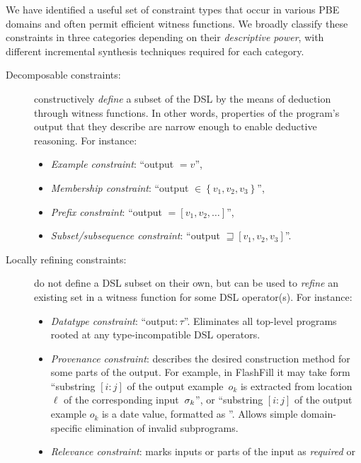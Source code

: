 We have identified a useful set of constraint types that occur in various PBE domains and often permit efficient witness
functions.
We broadly classify these constraints in three categories depending on their \emph{descriptive power}, with different
incremental synthesis techniques required for each category.
\begin{description}
    \item[Decomposable constraints:] constructively \emph{define} a subset of the DSL by the means of
        deduction through witness functions.
        In other words, properties of the program's output that they describe are narrow enough to enable deductive
        reasoning.
        For instance:
        \begin{itemize}[nosep]
            \item \emph{Example constraint}: ``output $= v$'',
            \item \emph{Membership constraint}: ``output $\in \left\{v_1, v_2, v_3\right\}$'',
            \item \emph{Prefix constraint}: ``output $= [v_1, v_2, \dots]$'',
            \item \emph{Subset/subsequence constraint}: ``output $\sqsupseteq [v_1, v_2, v_3]$''.
        \end{itemize}
    \item[Locally refining constraints:] do not define a DSL subset on their own, but can be used to
        \emph{refine} an existing set in a witness function for some DSL operator(s).
        For instance:
        \begin{itemize}[nosep]
            \item \emph{Datatype constraint}: ``output$\colon \tau$''.
                Eliminates all top-level programs rooted at any type-incompatible DSL operators.
            \item \emph{Provenance constraint}: describes the desired construction method for some parts of the output.
                For example, in FlashFill it may take form ``substring $[i:j]$ of the output example~$o_k$ is extracted from
                location $\ell$ of
                the corresponding input~$\sigma_k$'', or ``substring $[i:j]$ of the output example $o_k$ is a date
                value, formatted as
                ''.
                Allows simple domain-specific elimination of invalid subprograms.
            \item \emph{Relevance constraint}: marks inputs or parts of the input as \emph{required} or

\end{itemize}
\end{description}
